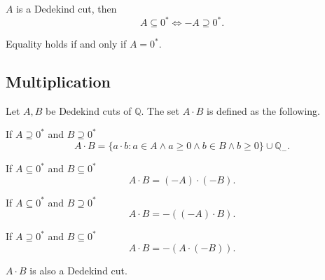 \begin{corollary}
    $A$ is a Dedekind cut, then
    \[
        A\subseteq {0}^{*} \Longleftrightarrow -A\supseteq {0}^{*}.
    \]

    Equality holds if and only if $A = {0}^{*}$.
\end{corollary}

\subsection{Multiplication}

\begin{theorem}[Multiplication]\label{theorem:chapter1:multiplication}
    Let $A, B$ be Dedekind cuts of $\mathbb{Q}$. The set $A\cdot B$ is defined as the following.

    If $A\supseteq{0}^{*}$ and $B\supseteq{0}^{*}$
    \[
        A\cdot B = \{ a\cdot b : a\in A\wedge a\ge 0 \wedge b\in B\wedge b\ge 0 \} \cup \mathbb{Q}_{-}.
    \]

    If $A\subseteq{0}^{*}$ and $B\subseteq{0}^{*}$
    \[
        A\cdot B = (-A)\cdot (-B).
    \]

    If $A\subseteq{0}^{*}$ and $B\supseteq{0}^{*}$
    \[
        A\cdot B = -\left((-A)\cdot B\right).
    \]

    If $A\supseteq{0}^{*}$ and $B\subseteq{0}^{*}$
    \[
        A\cdot B = -\left(A\cdot (-B)\right).
    \]

    $A\cdot B$ is also a Dedekind cut.
\end{theorem}

